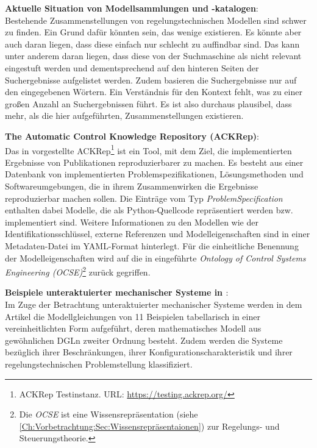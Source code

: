 \textbf{Aktuelle Situation von Modellsammlungen und -katalogen}: \\
Bestehende Zusammenstellungen von regelungstechnischen Modellen sind schwer zu finden. Ein Grund dafür könnten sein, das wenige existieren. Es könnte aber auch daran liegen, dass diese einfach nur schlecht zu auffindbar sind. Das kann unter anderem daran liegen, dass diese von der Suchmaschine als nicht relevant eingestuft werden und dementsprechend auf den hinteren Seiten der Suchergebnisse aufgelistet werden. Zudem basieren die Suchergebnisse nur auf den eingegebenen Wörtern. Ein Verständnis für den Kontext fehlt, was zu einer großen Anzahl an Suchergebnissen führt. Es ist also durchaus plausibel, dass mehr, als die hier aufgeführten, Zusammenstellungen existieren. 

\textbf{The Automatic Control Knowledge Repository (ACKRep)}:\\
Das in \cite{KNHE20a} vorgestellte ACKRep\footnote{ACKRep Testinstanz. \tiny{URL}\normalsize: \url{https://testing.ackrep.org/}} ist ein Tool, mit dem Ziel, die implementierten Ergebnisse von Publikationen reproduzierbarer zu machen. Es besteht aus einer Datenbank von implementierten Problemspezifikationen, Lösungsmethoden und Softwareumgebungen, die in ihrem Zusammenwirken die Ergebnisse reproduzierbar machen sollen. Die Einträge vom Typ \textit{ProblemSpecification} enthalten dabei Modelle, die als Python-Quellcode repräsentiert werden bzw. implementiert sind. Weitere Informationen zu den Modellen wie der Identifikationsschlüssel, externe Referenzen und Modelleigenschaften sind in einer Metadaten-Datei im YAML-Format hinterlegt. Für die einheitliche Benennung der Modelleigenschaften wird auf die in \cite{KNHE20b} eingeführte \textit{Ontology of Control Systems Engineering (OCSE)}\footnote{Die \textit{OCSE} ist eine Wissensrepräsentation (siehe \autoref{Ch:Vorbetrachtung:Sec:Wissensrepräsentaionen}) zur Regelungs- und Steuerungstheorie.} zurück gegriffen.

\textbf{Beispiele unteraktuierter mechanischer Systeme in \cite{LIYU13}}:\\
Im Zuge der Betrachtung unteraktuierter mechanischer Systeme werden in dem Artikel die Modellgleichungen von 11 Beispielen tabellarisch in einer vereinheitlichten Form aufgeführt, deren mathematisches Modell aus gewöhnlichen DGLn zweiter Ordnung besteht. Zudem werden die Systeme bezüglich ihrer Beschränkungen, ihrer Konfigurationscharakteristik und ihrer regelungstechnischen Problemstellung klassifiziert.

